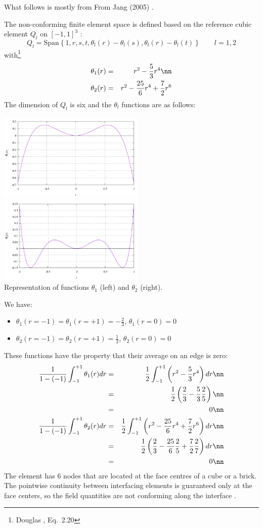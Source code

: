 What follows is mostly from From Jang \etal (2005) \cite{jalk05}.

The non-conforming finite element space is defined based on the 
reference cubic element $Q_l$ on $[-1,1]^3$ :
\[
Q_l = \text{Span} \left\{ 1, r, s, t, \theta_l(r)-\theta_l(s), \theta_l(r)-\theta_l(t) \right\}
\qquad l=1,2
\]
with\footnote{Douglas \etal \cite{doss99}, Eq.~2.20} 
\begin{eqnarray}
\theta_1(r) &=& r^2-\frac53r^4  \nn\\
\theta_2(r) &=& r^2-\frac{25}{6} r^4 + \frac72 r^6 
\end{eqnarray}
The dimension of $Q_l$ is six and the $\theta_l$ functions are as follows:
\begin{center}
\includegraphics[width=7cm]{images/dssy/theta1}
\includegraphics[width=7cm]{images/dssy/theta2}\\
{\captionfont Representation of functions $\theta_1$ (left) and 
$\theta_2$ (right).} 
\end{center}
We have:
\begin{itemize}
\item $\theta_1(r=-1)=\theta_1(r=+1)=-\frac23$, $\theta_1(r=0)=0$ 
\item $\theta_2(r=-1)=\theta_2(r=+1)=\frac13$, $\theta_2(r=0)=0$ 
\end{itemize}
These functions have the property that their average on an edge is zero:
\begin{eqnarray}
\frac{1}{1-(-1)}\int_{-1}^{+1} \theta_1(r) dr 
&=& \frac{1}{2}\int_{-1}^{+1} \left( r^2-\frac53r^4  \right) dr \nn\\
&=& \frac12 \left( \frac23 - \frac53 \frac25 \right) \nn\\
&=& 0 \nn\\
\frac{1}{1-(-1)}\int_{-1}^{+1} \theta_2(r) dr 
&=& \frac{1}{2}\int_{-1}^{+1} \left( r^2-\frac{25}{6} r^4 + \frac72 r^6  \right) dr \nn\\
&=& \frac{1}{2} \left( \frac23 -\frac{25}{6} \frac25 + \frac72 \frac{2}{7}  \right) dr \nn\\
&=& 0 \nn
\end{eqnarray}
The element has 6 nodes that are located at the face centres of a cube or a brick.
The pointwise continuity between interfacing elements is guaranteed only at the face centers,
so the field quantities are not conforming along the interface \cite{jalk05}.

